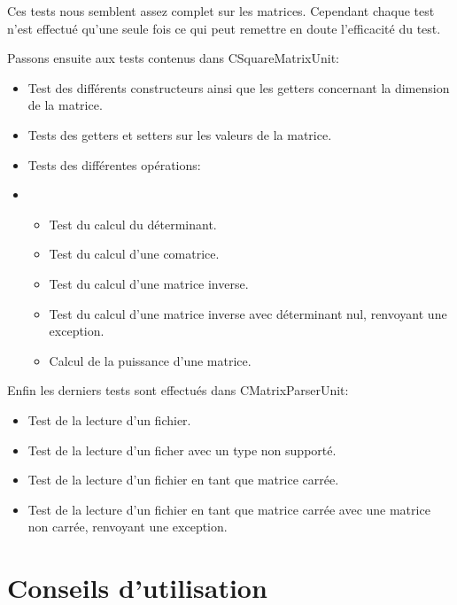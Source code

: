 		Ces tests nous semblent assez complet sur les matrices. Cependant chaque test n'est effectué qu'une seule fois ce qui peut remettre en doute l'efficacité du test.
		
		Passons ensuite aux tests contenus dans CSquareMatrixUnit:
		\begin{itemize}
			\item Test des différents constructeurs ainsi que les getters concernant la dimension de la matrice.
			\item Tests des getters et setters sur les valeurs de la matrice.
			\item Tests des différentes opérations:
			\item 
			\begin{itemize}
				\item Test du calcul du déterminant.
				\item Test du calcul d'une comatrice.
				\item Test du calcul d'une matrice inverse.
				\item Test du calcul d'une matrice inverse avec déterminant nul, renvoyant une exception.
				\item Calcul de la puissance d'une matrice.
			\end{itemize}
		\end{itemize}
		
		Enfin les derniers tests sont effectués dans CMatrixParserUnit:
		\begin{itemize}
			\item Test de la lecture d'un fichier.
			\item Test de la lecture d'un ficher avec un type non supporté.
			\item Test de la lecture d'un fichier en tant que matrice carrée.
			\item Test de la lecture d'un fichier en tant que matrice carrée avec une matrice non carrée, renvoyant une exception.
		\end{itemize}
	
	\chapter{Conseils d'utilisation}


